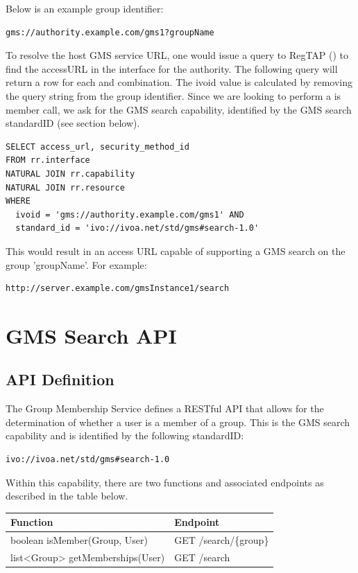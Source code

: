 \documentclass[11pt,a4paper]{ivoa}
\begin{document}
Below is an example group identifier:

\begin{verbatim}
gms://authority.example.com/gms1?groupName
\end{verbatim}

To resolve the host GMS service URL, one would issue a query to RegTAP (\citep{std:RegTAP}) to find the accessURL in the interface for the authority.  The following query will return a row for each  and  combination.  The ivoid value is calculated by removing the query string from the group identifier.  Since we are looking to perform a is member call, we ask for the GMS search capability, identified by the GMS search standardID (see section below).

\begin{verbatim}
SELECT access_url, security_method_id
FROM rr.interface
NATURAL JOIN rr.capability
NATURAL JOIN rr.resource
WHERE
  ivoid = 'gms://authority.example.com/gms1' AND
  standard_id = 'ivo://ivoa.net/std/gms#search-1.0'
\end{verbatim}

This would result in an access URL capable of supporting a GMS search on the group 'groupName'.  For example:

\begin{verbatim}
http://server.example.com/gmsInstance1/search
\end{verbatim}

\section{GMS Search API}

\subsection{API Definition}

The Group Membership Service defines a RESTful API \citep{fielding00} that allows for the determination of whether a user is a member of a group.  This is the GMS search capability and is identified by the following standardID:

\begin{verbatim}
ivo://ivoa.net/std/gms#search-1.0
\end{verbatim}

Within this capability, there are two functions and associated endpoints as described in the table below.

\vspace{3mm}
\begin{tabular}{l l}
\textbf{Function} & \textbf{Endpoint} \\
\hline
boolean isMember(Group, User) & GET /search/\{group\} \\
\hline
list<Group> getMemberships(User) & GET /search \\
\hline
\end{tabular}
\vspace{3mm}
\end{document}
